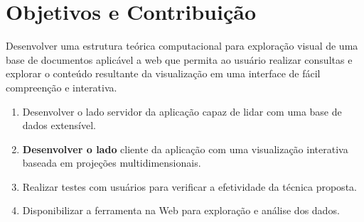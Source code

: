 \section{Objetivos e Contribuição}
\label{Objetivos}

Desenvolver uma estrutura teórica computacional para exploração visual de uma base de documentos aplicável a web que permita ao usuário realizar consultas e explorar o conteúdo resultante da visualização em uma interface de fácil compreenção e interativa.


\begin{enumerate} %
	\item Desenvolver o lado servidor da aplicação capaz de lidar com uma base de dados extensível.
    \item \textbf{Desenvolver o lado} cliente da aplicação com uma visualização interativa baseada em projeções multidimensionais.
%
%
       \item Realizar testes com usuários para verificar a efetividade da técnica proposta.
	\item Disponibilizar a ferramenta na Web para exploração e análise dos dados.
		
	
\end{enumerate} %